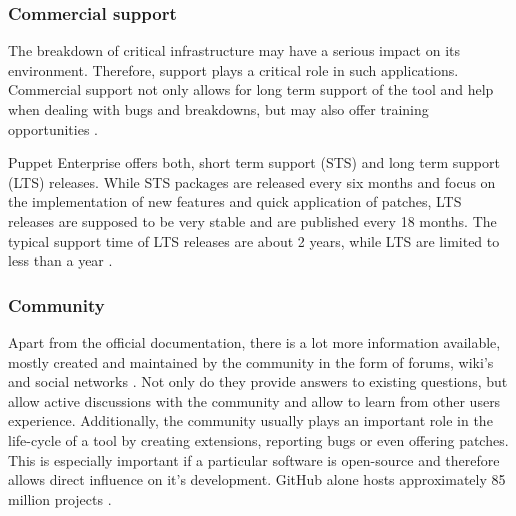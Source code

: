 \subsubsection{Commercial support}

The breakdown of critical infrastructure may have a serious impact on its environment. Therefore, support plays a critical role in such applications. Commercial support not only allows for long term support of the tool and help when dealing with bugs and breakdowns, but may also offer training opportunities \cite{delaet2010survey}.

Puppet Enterprise offers both, short term support (STS) and long term support (LTS) releases. While STS packages are released every six months and focus on the implementation of new features and quick application of patches, LTS releases are supposed to be very stable and are published every 18 months. The typical support time of LTS releases are about 2 years, while LTS are limited to less than a year \cite{puppetcomenterpriselifecycle}.

\subsubsection{Community}

Apart from the official documentation, there is a lot more information available, mostly created and maintained by the community in the form of forums, wiki's and social networks \cite{delaet2010survey}. Not only do they provide answers to existing questions, but allow active discussions with the community and allow to learn from other users experience. Additionally, the community usually plays an important role in the life-cycle of a tool by creating extensions, reporting bugs or even offering patches. This is especially important if a particular software is open-source and therefore allows direct influence on it's development. GitHub alone hosts approximately 85 million projects \cite{githubabout}.

